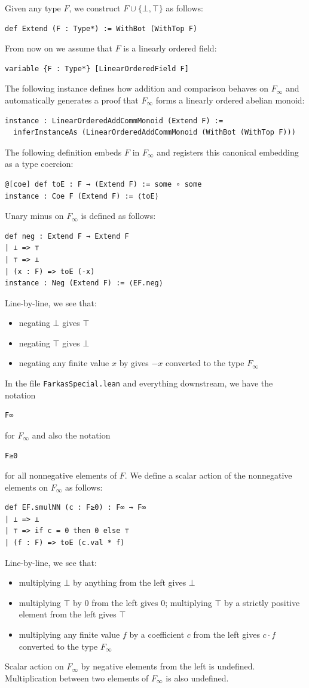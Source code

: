 \documentclass[]{article}
\renewcommand{\.}{\hskip .75pt}
\let\*=\cdot
\begin{document}
Given any type $F$, we construct $F \cup \{ \bot, \top \}$ as follows:
\begin{lstlisting}
def Extend (F : Type*) := WithBot (WithTop F)
\end{lstlisting}
From now on we assume that $F$ is a linearly ordered field:
\begin{lstlisting}
variable {F : Type*} [LinearOrderedField F]
\end{lstlisting}
The following instance defines how addition and comparison
behaves on $F_\infty$ and automatically generates a proof
that $F_\infty$ forms a linearly ordered abelian monoid:
\begin{lstlisting}
instance : LinearOrderedAddCommMonoid (Extend F) :=
  inferInstanceAs (LinearOrderedAddCommMonoid (WithBot (WithTop F)))
\end{lstlisting}
The following definition embeds $F$ in $F_\infty$ and registers
this canonical embedding as a type coercion:
\begin{lstlisting}
@[coe] def toE : F → (Extend F) := some ∘ some
instance : Coe F (Extend F) := ⟨toE⟩
\end{lstlisting}
Unary minus on $F_\infty$ is defined as follows:
\begin{lstlisting}
def neg : Extend F → Extend F
| ⊥ => ⊤
| ⊤ => ⊥
| (x : F) => toE (-x)
instance : Neg (Extend F) := ⟨EF.neg⟩
\end{lstlisting}
Line-by-line, we see that:
\begin{itemize}
\item negating $\bot$ gives $\top$
\item negating $\top$ gives $\bot$
\item negating any finite value $x$ by gives $-x$ converted to the type $F_\infty$
\end{itemize}
In the file \texttt{FarkasSpecial.lean} and everything downstream,
we have the notation
\begin{lstlisting}
F∞
\end{lstlisting}
for $F_\infty$ and also the notation
\begin{lstlisting}
F≥0
\end{lstlisting}
for all nonnegative elements of $F$.
We define a scalar action of the nonnegative elements
on $F_\infty$ as follows:
\begin{lstlisting}
def EF.smulNN (c : F≥0) : F∞ → F∞
| ⊥ => ⊥
| ⊤ => if c = 0 then 0 else ⊤
| (f : F) => toE (c.val * f)
\end{lstlisting}
Line-by-line, we see that:
\begin{itemize}
\item multiplying $\bot$ by anything from the left gives $\bot$
\item multiplying $\top$ by $0$ from the left gives $0$;
multiplying $\top$ by a strictly positive element from the left gives $\top$
\item multiplying any finite value $f$ by a coefficient $c$ from the left
gives $c \* f$ converted to the type $F_\infty$
\end{itemize}
Scalar action on $F_\infty$ by negative elements from the left is undefined.
Multiplication between two elements of $F_\infty$ is also undefined.
\end{document}
